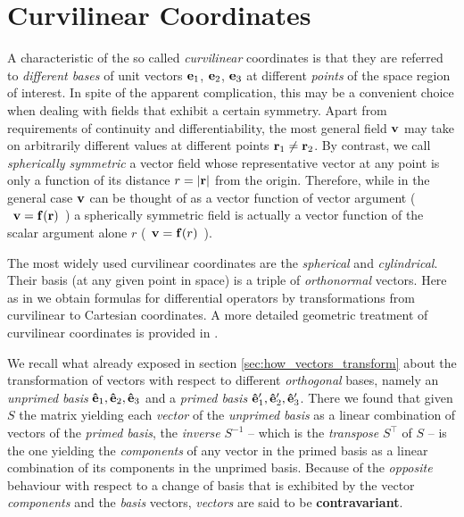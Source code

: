 \section{Curvilinear Coordinates}
A characteristic of the so called \textit{curvilinear} coordinates is that they are referred to \textit{different bases} of unit vectors $\vb{e}_1$, $\vb{e}_2$, $\vb{e}_3$ at different \textit{points} of the space region of interest. In spite of the apparent complication, this may be a convenient choice when dealing with fields that exhibit a certain symmetry. Apart from requirements of continuity and differentiability, the most general field $\vb{v}$ may take on arbitrarily different values at different points $\vb{r}_1 \neq \vb{r}_2$.  By contrast, we call \textit{spherically symmetric} a vector field whose representative vector at any point is only a function of its distance $r = \abs{\vb{r}}$ from the origin. Therefore, while in the general case $\vb{v}$ can be thought of as a vector function of vector argument ($\:\:\vb{v} = \vb{f}(\vb{r})\:\:$) a spherically symmetric field is actually a vector function of the scalar argument alone $r$   ($\:\:\vb{v} = \vb{f}(r)\:\:$). 

The most widely used curvilinear coordinates are the  \textit{spherical} and \textit{cylindrical}. Their basis (at any given point in space) is a triple of \textit{orthonormal} vectors. Here as in \cite{Griffiths_4th} we obtain formulas for differential operators by transformations from curvilinear to Cartesian coordinates. A more detailed geometric treatment of curvilinear coordinates is provided in \cite{BudakFomin_1973}.  

We recall what already exposed in section \ref{sec:how_vectors_transform} about the transformation of vectors with respect to different \textit{orthogonal} bases, namely an \textit{unprimed basis} $\vu{e}_1, \vu{e}_2, \vu{e}_3$ and a \textit{primed basis} ${\vu{e}_1}',{\vu{e}_2}', {\vu{e}_3}'$. There we found that given $S$ the matrix yielding each \textit{vector} of the \textit{unprimed basis} as a linear combination of vectors of the  \textit{primed basis}, the \textit{inverse} $S^{-1}$ -- which is the \textit{transpose}  $S^\top$ of $S$ -- is the one yielding the \textit{components} of any vector in the primed basis as a linear combination of its components in the unprimed basis. Because of the \textit{opposite} behaviour with respect to a change of basis that is exhibited by the vector \textit{components} and the \textit{basis} vectors, \textit{vectors} are said to be \textbf{contravariant}.

